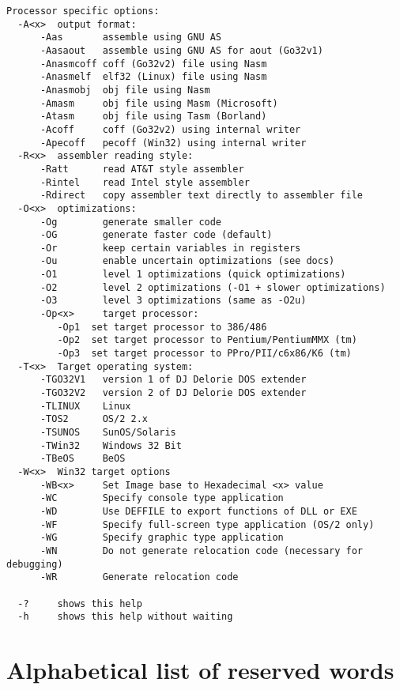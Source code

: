 \begin{verbatim}
Processor specific options:
  -A<x>  output format:
      -Aas       assemble using GNU AS
      -Aasaout   assemble using GNU AS for aout (Go32v1)
      -Anasmcoff coff (Go32v2) file using Nasm
      -Anasmelf  elf32 (Linux) file using Nasm
      -Anasmobj  obj file using Nasm
      -Amasm     obj file using Masm (Microsoft)
      -Atasm     obj file using Tasm (Borland)
      -Acoff     coff (Go32v2) using internal writer
      -Apecoff   pecoff (Win32) using internal writer
  -R<x>  assembler reading style:
      -Ratt      read AT&T style assembler
      -Rintel    read Intel style assembler
      -Rdirect   copy assembler text directly to assembler file
  -O<x>  optimizations:
      -Og        generate smaller code
      -OG        generate faster code (default)
      -Or        keep certain variables in registers
      -Ou        enable uncertain optimizations (see docs)
      -O1        level 1 optimizations (quick optimizations)
      -O2        level 2 optimizations (-O1 + slower optimizations)
      -O3        level 3 optimizations (same as -O2u)
      -Op<x>     target processor:
         -Op1  set target processor to 386/486
         -Op2  set target processor to Pentium/PentiumMMX (tm)
         -Op3  set target processor to PPro/PII/c6x86/K6 (tm)
  -T<x>  Target operating system:
      -TGO32V1   version 1 of DJ Delorie DOS extender
      -TGO32V2   version 2 of DJ Delorie DOS extender
      -TLINUX    Linux
      -TOS2      OS/2 2.x
      -TSUNOS    SunOS/Solaris
      -TWin32    Windows 32 Bit
      -TBeOS     BeOS
  -W<x>  Win32 target options
      -WB<x>     Set Image base to Hexadecimal <x> value
      -WC        Specify console type application
      -WD        Use DEFFILE to export functions of DLL or EXE
      -WF        Specify full-screen type application (OS/2 only)
      -WG        Specify graphic type application
      -WN        Do not generate relocation code (necessary for debugging)
      -WR        Generate relocation code
  
  -?     shows this help
  -h     shows this help without waiting
\end{verbatim}



\chapter{Alphabetical list of reserved words}
\label{ch:reserved}
\begin{multicols}{3}

\end{multicols}

